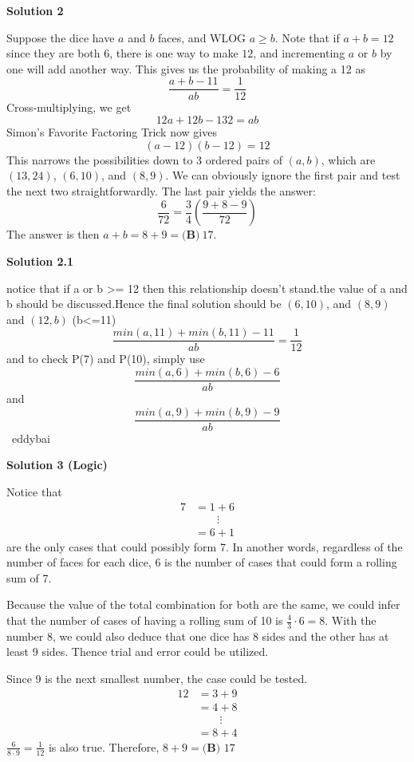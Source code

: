 \begin{enumerate}
 



\textbf{Solution 2}

Suppose the dice have $a$ and $b$ faces, and WLOG $a\geq{b}$. Note that if $a+b=12$ since they are both $6$, there is one way to make $12$, and incrementing $a$ or $b$ by one will add another way. This gives us the probability of making a 12 as 
 \[\frac{a+b-11}{ab}=\frac{1}{12}\]Cross-multiplying, we get
 \[12a+12b-132=ab\]Simon's Favorite Factoring Trick now gives
 \[(a-12)(b-12)=12\]This narrows the possibilities down to 3 ordered pairs of $(a,b)$, which are $(13,24)$, $(6,10)$, and $(8,9)$.  We can obviously ignore the first pair and test the next two straightforwardly.  The last pair yields the answer:
 \[\frac{6}{72}=\frac{3}{4}\left(\frac{9+8-9}{72}\right)\]The answer is then $a+b=8+9=\boxed{\textbf{(B)}\ 17}$.

 



\textbf{Solution 2.1}

notice that if a or b >= 12 then this relationship doesn't stand.the value of a and b should be discussed.Hence the final solution should be $(6,10)$, and $(8,9)$ and $(12,b)$ (b<=11)
 \[\frac{min(a,11)+min(b,11)-11}{ab}=\frac{1}{12}\]and to check P(7) and P(10), simply use 
 \[\frac{min(a,6)+min(b,6)-6}{ab}\] and 
 \[\frac{min(a,9)+min(b,9)-9}{ab}\]~eddybai

 



\textbf{Solution 3 (Logic)}

Notice that
 \begin{align*}     7&=1+6 \\     &\ \ \ \ \ \ \ \ \ \vdots \\     &=6+1 \end{align*}
are the only cases that could possibly form 7. In another words, regardless of the number of faces for each dice, 6 is the number of cases that could form a rolling sum of 7.

 
Because the value of the total combination for both are the same, we could infer that the number of cases of having a rolling sum of 10 is $\frac{4}{3}\cdot6=8$. With the number 8, we could also deduce that one dice has 8 sides and the other has at least 9 sides. Thence trial and error could be utilized.

 
Since 9 is the next smallest number, the case could be tested.
 \begin{align*}     12&=3+9 \\     &=4+8 \\     &\ \ \ \ \ \ \ \ \ \vdots \\     &=8+4 \end{align*}
$\frac{6}{8\cdot9}=\frac{1}{12}$ is also true. Therefore, $8+9=\boxed{\textbf{(B) }17}$





\end{enumerate}

